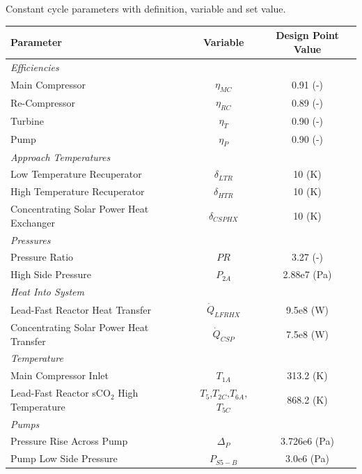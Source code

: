 \begin{paracol}{2}
\begin{specialtable}[htbp] 
    \caption{Constant cycle parameters with definition, variable and set value. \label{cycle-constants}}
    \begin{tabular}{lcc}
    \toprule
    \textbf{Parameter} & \textbf{Variable}	& \textbf{Design Point Value}\\
    \midrule
    \textit{Efficiencies}\\
    Main Compressor & $\eta_{MC}$		& 0.91 (-)\\
    Re-Compressor & $\eta_{RC}$		& 0.89 (-)\\
    Turbine & $\eta_{T}$		& 0.90 (-)\\
    Pump & $\eta_{P}$      & 0.90 (-)\\
    \midrule
    \textit{Approach Temperatures}\\
    Low Temperature Recuperator & $\delta_{LTR}$		& 10 (K)\\
    High Temperature Recuperator & $\delta_{HTR}$		& 10 (K)\\
    Concentrating Solar Power Heat Exchanger & $\delta_{CSPHX}$	& 10 (K)\\
    \midrule
    \textit{Pressures}\\
    Pressure Ratio & $PR$ & 3.27 (-)\\
    High Side Pressure & $P_{2A}$ & 2.88e7 (Pa)\\
    \midrule
    \textit{Heat Into System}\\
    Lead-Fast Reactor Heat Transfer & $\dot{Q}_{LFRHX}$ & 9.5e8 (W)\\
    Concentrating Solar Power Heat Transfer & $\dot{Q}_{CSP}$ & 7.5e8 (W)\\
    \midrule
    \textit{Temperature}\\
    Main Compressor Inlet & $T_{1A}$ & 313.2 (K)\\
    Lead-Fast Reactor sCO$_{2}$ High Temperature & $T_{5}$,$T_{2C}$,$T_{6A}$,$T_{5C}$ & 868.2 (K)\\
    \midrule
    \textit{Pumps}\\
    Pressure Rise Across Pump & $\Delta_{P}$ & 3.726e6 (Pa)\\
    Pump Low Side Pressure & $P_{S5-B}$ & 3.0e6 (Pa)\\ 
    \bottomrule
    \end{tabular}
\end{specialtable}


\end{paracol}
